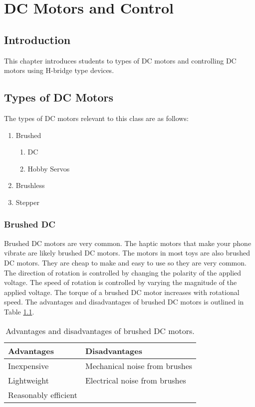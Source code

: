 \chapter{DC Motors and Control}

\section{Introduction}
This chapter introduces students to types of DC motors and controlling DC motors using H-bridge type devices.

\section{Types of DC Motors}
The types of DC motors relevant to this class are as follows:
\begin{enumerate}
	\item Brushed
	\begin{enumerate}
		\item DC 
		\item Hobby Servos
	\end{enumerate}
	\item Brushless
	\item Stepper
\end{enumerate}

\subsection{Brushed DC}
Brushed DC motors are very common. The haptic motors that make your phone vibrate are likely brushed DC motors.
The motors in most toys are also brushed DC motors. They are cheap to make and easy to use so they are very
common. The direction of rotation is controlled by changing the polarity of the applied voltage. The speed of 
rotation is controlled by varying the magnitude of the applied voltage. The torque of a brushed DC motor 
increases with rotational speed. The advantages and disadvantages of brushed DC motors is outlined in 
Table \ref{table:dcbrushed}.

\begin{table}[!ht]
	\centering
	\begin{tabular}{l l}
		\hline
		Advantages & Disadvantages \\ 
		\hline
		Inexpensive & Mechanical noise from brushes \\
		Lightweight & Electrical noise from brushes \\
		Reasonably efficient  & \\
		\hline
	\end{tabular}
	\caption{Advantages and disadvantages of brushed DC motors.}
	\label{table:dcbrushed}
\end{table}

